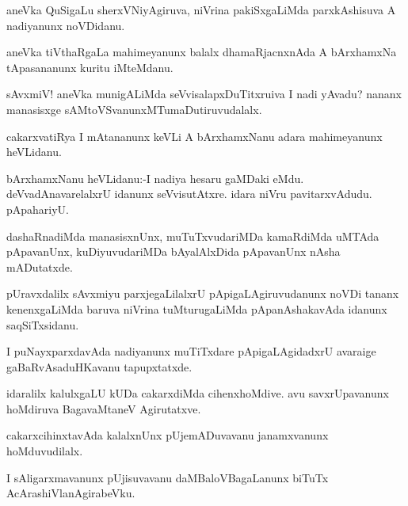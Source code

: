 \documentclass{article}
\begin{document}
\begin{mn}%
aneVka QuSigaLu sherxVNiyAgiruva, niVrina pakiSxgaLiMda parxkAshisuva A nadiyanunx noVDidanu.
\end{mn}

\begin{mn}%
aneVka tiVthaRgaLa mahimeyanunx balalx dhamaRjacnxnAda A bArxhamxNa tApasananunx kuritu 
iMteMdanu.
\end{mn}

\begin{mn}%
sAvxmiV! aneVka munigALiMda seVvisalapxDuTitxruiva I nadi yAvadu? nananx manasisxge 
sAMtoVSvanunxMTumaDutiruvudalalx.
\end{mn}

\begin{mn}%
cakarxvatiRya I mAtananunx keVLi A bArxhamxNanu adara mahimeyanunx heVLidanu.
\end{mn}

\begin{mn}%
bArxhamxNanu heVLidanu:-I nadiya hesaru gaMDaki eMdu. deVvadAnavarelalxrU idanunx 
seVvisutAtxre. idara niVru pavitarxvAdudu. pApahariyU.
\end{mn}

\begin{mn}%
dashaRnadiMda manasisxnUnx, muTuTxvudariMDa kamaRdiMda uMTAda pApavanUnx, kuDiyuvudariMDa 
bAyalAlxDida pApavanUnx nAsha mADutatxde.
\end{mn}

\begin{mn}%
pUravxdalilx sAvxmiyu parxjegaLilalxrU pApigaLAgiruvudanunx noVDi tananx kenenxgaLiMda 
baruva niVrina tuMturugaLiMda pApanAshakavAda idanunx saqSiTxsidanu.
\end{mn}

\begin{mn}%
I puNayxparxdavAda nadiyanunx muTiTxdare pApigaLAgidadxrU avaraige gaBaRvAsaduHKavanu 
tapupxtatxde.
\end{mn}

\begin{mn}%
idaralilx kalulxgaLU kUDa cakarxdiMda cihenxhoMdive. avu savxrUpavanunx hoMdiruva 
BagavaMtaneV Agirutatxve.
\end{mn}

\begin{mn}%
cakarxcihinxtavAda kalalxnUnx pUjemADuvavanu janamxvanunx hoMduvudilalx. 
\end{mn}

\begin{mn}%
I sAligarxmavanunx pUjisuvavanu daMBaloVBagaLanunx biTuTx AcArashiVlanAgirabeVku.
\end{mn}
\end{document}

